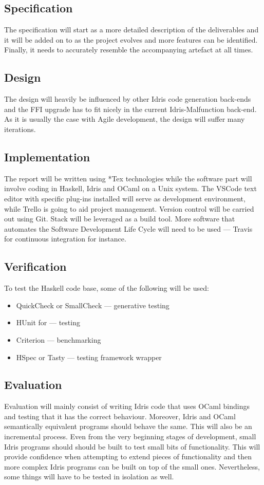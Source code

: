 \documentclass[a4paper, 12pt, oneside]{report}
\begin{document}
\subsection{Specification}
The specification will start as a more detailed description of the
deliverables and it will be added on to as the project evolves and more
features can be identified.
Finally, it needs to accurately resemble the accompanying artefact at all times.
\subsection{Design}
The design will heavily be influenced by other Idris code generation back-ends
and the FFI upgrade has to fit nicely in the current Idris-Malfunction back-end.
As it is usually the case with Agile development, the design will suffer many
iterations.
\subsection{Implementation}
The report will be written using *Tex technologies while the software part will
involve coding in Haskell, Idris and OCaml on a Unix system.
The VSCode text editor with specific plug-ins installed will serve as
development environment, while Trello is going to aid
project management.
Version control will be carried out using Git.
Stack will be leveraged as a build tool.
More software that automates the Software Development Life Cycle
will need to be used --- Travis for continuous integration for instance.

\subsection{Verification}
To test the Haskell code base, some of the following will be used:
\begin{itemize}
	\item QuickCheck or SmallCheck --- generative testing
	\item HUnit for --- testing
	\item Criterion --- benchmarking
	\item HSpec or Tasty --- testing framework wrapper
\end{itemize}

\subsection{Evaluation}
Evaluation will mainly consist of writing Idris code that uses OCaml bindings
and testing that it has the correct behaviour.
Moreover, Idris and OCaml semantically equivalent programs should behave
the same.
This will also be an incremental process.
Even from the very beginning stages of development, small Idris programs should
should be built to test small bits of functionality.
This will provide confidence when attempting to extend pieces of functionality
and then more complex Idris programs can be built on top of the small ones.
Nevertheless, some things will have to be tested in isolation as well.
\end{document}
